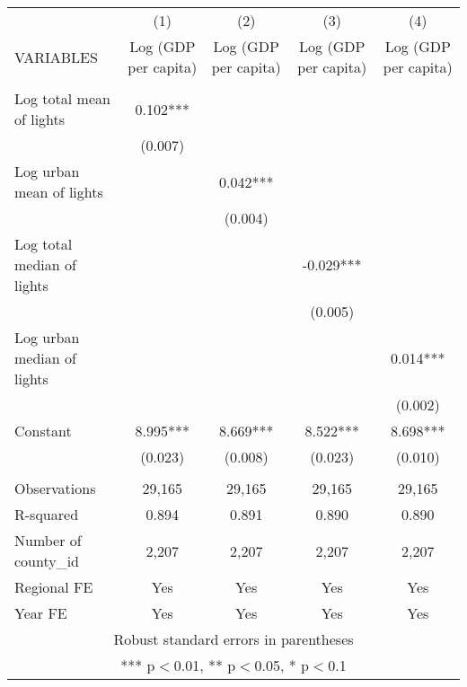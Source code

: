 \documentclass[]{article}
\begin{document}
\begin{tabular}{lcccc} \hline
 & (1) & (2) & (3) & (4) \\
VARIABLES & Log (GDP per capita) & Log (GDP per capita) & Log (GDP per capita) & Log (GDP per capita) \\ \hline
 &  &  &  &  \\
Log total mean of lights & 0.102*** &  &  &  \\
 & (0.007) &  &  &  \\
Log urban mean of lights &  & 0.042*** &  &  \\
 &  & (0.004) &  &  \\
Log total median of lights &  &  & -0.029*** &  \\
 &  &  & (0.005) &  \\
Log urban median of lights &  &  &  & 0.014*** \\
 &  &  &  & (0.002) \\
Constant & 8.995*** & 8.669*** & 8.522*** & 8.698*** \\
 & (0.023) & (0.008) & (0.023) & (0.010) \\
 &  &  &  &  \\
Observations & 29,165 & 29,165 & 29,165 & 29,165 \\
R-squared & 0.894 & 0.891 & 0.890 & 0.890 \\
Number of county\_id & 2,207 & 2,207 & 2,207 & 2,207 \\
Regional FE & Yes & Yes & Yes & Yes \\
 Year FE & Yes & Yes & Yes & Yes \\ \hline
\multicolumn{5}{c}{ Robust standard errors in parentheses} \\
\multicolumn{5}{c}{ *** p$<$0.01, ** p$<$0.05, * p$<$0.1} \\
\end{tabular}
\end{document}
